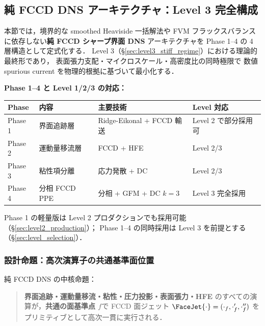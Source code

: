 %
%
\subsection{純 FCCD DNS アーキテクチャ：Level 3 完全構成}
\label{sec:pure_fccd_dns}

本節では，境界的な smoothed Heaviside 一括解法や
FVM フラックスバランスに依存しない\textbf{純 FCCD シャープ界面 DNS}
アーキテクチャを Phase 1--4 の 4 層構造として定式化する．
Level 3（§\ref{sec:level3_stiff_regime}）における理論的最終形であり，
表面張力支配・マイクロスケール・高密度比の同時極限で
数値 spurious current を物理的根拠に基づいて最小化する．

\noindent\textbf{Phase 1--4 と Level 1/2/3 の対応：}
\begin{center}
\small
\begin{tabular}{@{}llll@{}}
\hline
Phase & 内容 & 主要技術 & Level 対応 \\
\hline
Phase 1 & 界面追跡層 & Ridge-Eikonal + FCCD 輸送 & Level 2 で部分採用可 \\
Phase 2 & 運動量移流層 & FCCD + HFE & Level 2/3 \\
Phase 3 & 粘性項分離 & 応力発散 + DC & Level 2/3 \\
Phase 4 & 分相 FCCD PPE & 分相 + GFM + DC $k{=}3$ & Level 3 完全採用 \\
\hline
\end{tabular}
\end{center}
Phase 1 の軽量版は Level 2 プロダクションでも採用可能（§\ref{sec:level2_production}）；
Phase 1--4 の同時採用は Level 3 を前提とする（§\ref{sec:level_selection}）．

\subsubsection{設計命題：高次演算子の共通基準面位置}
\label{sec:pure_fccd_thesis}

純 FCCD DNS の中核命題：
\begin{quote}
\textbf{界面追跡・運動量移流・粘性・圧力投影・表面張力・HFE}
のすべての演算が，\textbf{共通の面基準点 $f$}で
FCCD 面ジェット $\FaceJet{\cdot}=(\cdot_f,\cdot'_f,\cdot''_f)$ を
プリミティブとして高次一貫に実行される．
\end{quote}

